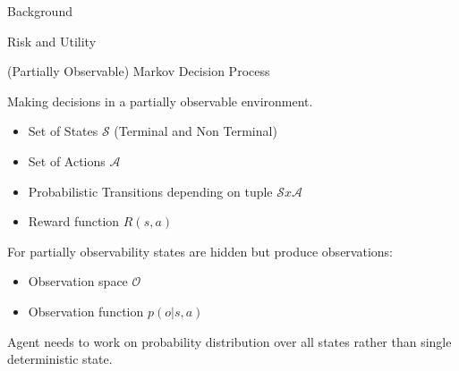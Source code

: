 \begin{exampleblock}{Background}
\begin{block}{Risk and Utility}
\end{block}


\begin{block}{(Partially Observable) Markov Decision Process}

Making decisions in a partially observable environment.

\begin{itemize}
    \item Set of States $\mathcal{S}$ (Terminal and Non Terminal)
    \item Set of Actions $\mathcal{A}$
    \item Probabilistic Transitions depending on tuple $\mathcal{S} x \mathcal{A}$
    \item Reward function $R(s,a)$
\end{itemize}

For partially observability states are hidden but produce observations:
\begin{itemize}
    \item Observation space $\mathcal{O}$
    \item Observation function $p(o | s, a)$
\end{itemize}

Agent needs to work on probability distribution over all states rather than single deterministic state.
\end{block}

\end{exampleblock}
